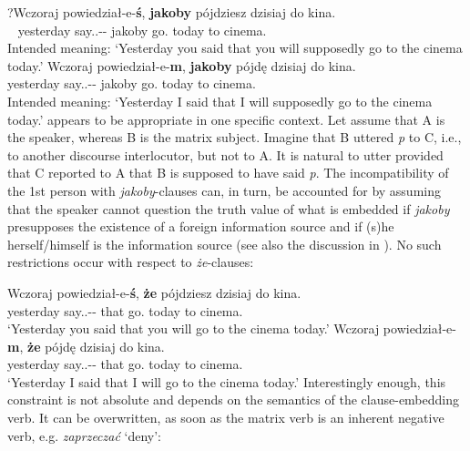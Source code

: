 \documentclass[output=paper
,modfonts
,nonflat]{langsci/langscibook}
\begin{document}
\ea \ea \gll	?Wczoraj powiedział-e-\textbf{ś}, \textbf{jakoby} pójdziesz dzisiaj do kina. \label{drugaosoba} \\
  		~	yesterday say.{\lptcp}.{\sg}-{\masc}-{\secondperson}{\sg} jakoby go.{\secondperson}{\sg} today to cinema.{\gen} \\
	\glt		Intended meaning: `Yesterday you said that  you will supposedly go to the cinema today.'
		\ex \gll	*Wczoraj powiedział-e-\textbf{m}, \textbf{jakoby} pójdę dzisiaj do kina. \label{pierwszy} \\
  			yesterday say.{\lptcp}.{\sg}-{\masc}-{\firstperson}{\sg} jakoby go.{\firstperson}{\sg} today to cinema.{\gen}\\
	\glt		Intended meaning: `Yesterday I said that I will supposedly go to the cinema today.'
\z\z
{} appears to be appropriate in one specific context. Let assume that A is the speaker, whereas B is the matrix subject. Imagine that B uttered \emph{p} to C, i.e., to another discourse interlocutor, but not to A. It is natural to utter  provided that C reported to A that B is supposed to have said \emph{p}. The incompatibility of the 1st person with \emph{jakoby}-clauses can, in turn, be accounted for by assuming that the speaker cannot question the truth value of what is embedded if \emph{jakoby} presupposes the existence of a foreign information source and if (s)he herself\slash himself is the information source (see also the discussion in \cite{Curnow2002}). No such restrictions occur with respect to \emph{że}-clauses:

 \ea \ea \gll Wczoraj powiedział-e-\textbf{ś}, \textbf{że} pójdziesz dzisiaj do kina. \\
  			yesterday say.{\lptcp}.{\sg}-{\masc}-{\secondperson}{\sg} that go.{\secondperson}{\sg} today to cinema.{\gen} \\
	\glt		`Yesterday you said that you will go to the cinema today.'
	\ex \gll Wczoraj powiedział-e-\textbf{m}, \textbf{że} pójdę dzisiaj do kina. \\
  			yesterday say.{\lptcp}.{\sg}-{\masc}-{\firstperson}{\sg} that go.{\firstperson}{\sg} today to cinema.{\gen} \\
    \glt `Yesterday I said that I will go to the cinema today.'
\z
\z
Interestingly enough, this constraint is not absolute and depends on the semantics of the clause-embedding verb. It can be overwritten, as soon as the matrix verb is an inherent negative verb, e.g. \emph{zaprzeczać} `deny':
\end{document}
